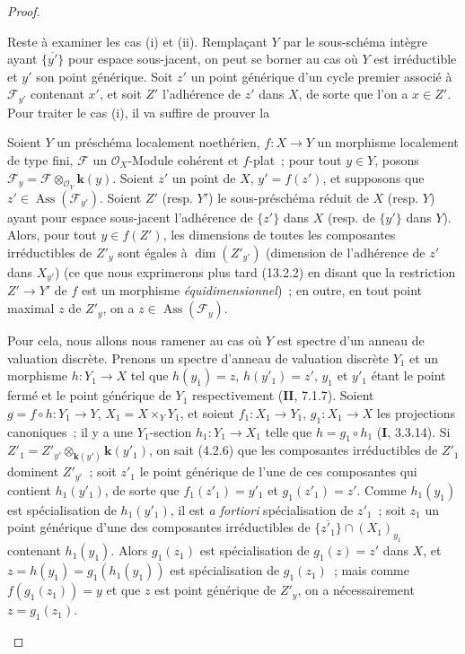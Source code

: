 \begin{proof}
\begin{env}[12.1.1.4]
\label{IV.12.1.1.4-fr}
Reste à examiner les cas (i) et (ii). Remplaçant $Y$ par le sous-schéma intègre
ayant $\overline{\{y'\}}$ pour espace sous-jacent, on peut se borner au cas où
$Y$ est irréductible et $y'$ son point générique. Soit $z'$ un point générique
d'un cycle premier associé à $\mathcal F_{y'}$
contenant $x'$, et soit $Z'$ l'adhérence de $z'$ dans $X$, de sorte que l'on a
$x\in Z'$. Pour traiter le cas (i), il va suffire de prouver la

\begin{proposition}[12.1.1.5]
\label{IV.12.1.1.5-fr}
Soient $Y$ un préschéma localement noethérien, $f:X\to Y$ un morphisme
localement de type fini, $\mathcal F$ un $\mathcal O_X$-Module cohérent et
$f$-\textup{plat}~; pour tout $y\in Y$, posons
$\mathcal F_y=\mathcal F\otimes_{\mathcal O_Y}\boldsymbol{k}(y)$. Soient $z'$ un point de
$X$, $y'=f(z')$, et supposons que $z'\in\operatorname{Ass}(\mathcal F_{y'})$.
Soient $Z'$ \textup{(resp. $Y'$)} le sous-préschéma réduit de $X$ \textup{(resp. $Y$)} ayant
pour espace sous-jacent l'adhérence de $\{z'\}$ dans $X$ \textup{(resp.} de $\{y'\}$
dans $Y$\textup{)}. Alors, pour tout $y\in f(Z')$, les dimensions de toutes les
composantes irréductibles de $Z'_y$ sont égales à $\dim(Z'_{y'})$ (dimension
de l'adhérence de $z'$ dans $X_{y'}$) \textup{(ce que nous exprimerons plus tard
(13.2.2) en disant que la restriction $Z'\to Y'$ de $f$ est un morphisme
\emph{équidimensionnel})}~; en outre, en tout point maximal $z$ de $Z'_y$, on a
$z\in\operatorname{Ass}(\mathcal F_y)$.
\end{proposition}

Pour cela, nous allons nous ramener au cas où $Y$ est spectre d'un anneau de
valuation discrète. Prenons un spectre d'anneau de valuation discrète $Y_1$ et
un morphisme $h:Y_1\to X$ tel que $h(y_1)=z$, $h(y'_1)=z'$, $y_1$ et $y'_1$
étant le point fermé et le point générique de $Y_1$ respectivement
($\mathbf{II}$, 7.1.7). Soient $g=f\circ h:Y_1\to Y$,
$X_1=X\times_YY_1$, et soient $f_1:X_1\to Y_1$, $g_1:X_1\to X$ les projections
canoniques~; il y a une $Y_1$-section $h_1:Y_1\to X_1$ telle que
$h=g_1\circ h_1$ ($\mathbf I$, 3.3.14). Si
$Z'_1=Z'_{y'}\otimes_{\mathbf{k}(y')}\boldsymbol{k}(y'_1)$, on sait (4.2.6) que les composantes
irréductibles de $Z'_1$ dominent $Z'_{y'}$~; soit $z'_1$ le point générique de
l'une de ces composantes qui contient $h_1(y'_1)$, de sorte que
$f_1(z'_1)=y'_1$ et $g_1(z'_1)=z'$. Comme $h_1(y_1)$ est spécialisation de
$h_1(y'_1)$, il est \emph{a fortiori} spécialisation de $z'_1$~; soit $z_1$ un
point générique d'une des composantes irréductibles de
$\overline{\{z'_1\}}\cap(X_1)_{y_1}$ contenant $h_1(y_1)$. Alors $g_1(z_1)$
est spécialisation de $g_1(z)=z'$ dans $X$, et
$z=h(y_1)=g_1(h_1(y_1))$ est spécialisation de $g_1(z_1)$~; mais comme
$f(g_1(z_1))=y$ et que $z$ est point générique de $Z'_y$, on a nécessairement
$z=g_1(z_1)$.


\end{env}
\end{proof}
